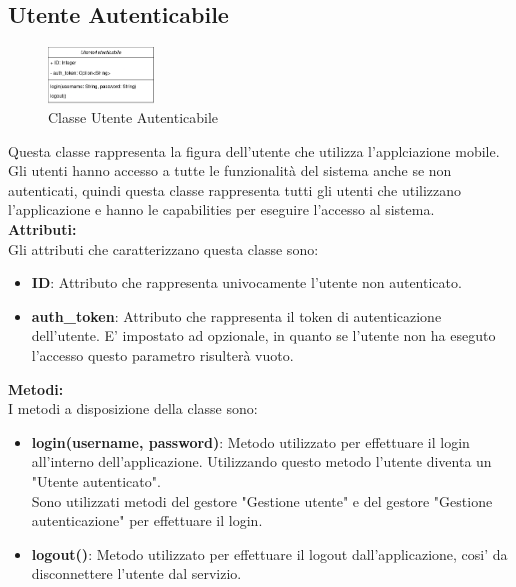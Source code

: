 \documentclass{article}
\begin{document}
\subsection{Utente Autenticabile}

\begin{figure}[htbp]
	\centering
	\includegraphics[width=0.25\textwidth]{Images/UtenteAutenticabile-Class.png}
	\caption{Classe Utente Autenticabile}
	\label{fig:UtenteAutenticabile}
\end{figure}

Questa classe rappresenta la figura dell'utente che utilizza l'applciazione mobile.\\
Gli utenti hanno accesso a tutte le funzionalità del sistema anche se non autenticati, quindi questa classe rappresenta tutti gli utenti che utilizzano l'applicazione e hanno le capabilities per eseguire l'accesso al sistema.\\

\textbf{Attributi:}\\

Gli attributi che caratterizzano questa classe sono:
\begin{itemize}
	\item \textbf{ID}: Attributo che rappresenta univocamente l'utente non autenticato.
	\item \textbf{auth\_token}: Attributo che rappresenta il token di autenticazione dell'utente. E' impostato ad opzionale, in quanto se l'utente non ha eseguto l'accesso questo parametro risulterà vuoto.
\end{itemize}

\textbf{Metodi:}\\

I metodi a disposizione della classe sono:
\begin{itemize}
	\item \textbf{login(username, password)}: Metodo utilizzato per effettuare il login all'interno dell'applicazione. Utilizzando questo metodo l'utente diventa un "Utente autenticato".\\Sono utilizzati metodi del gestore "Gestione utente" e del gestore "Gestione autenticazione" per effettuare il login.
	\item \textbf{logout()}: Metodo utilizzato per effettuare il logout dall'applicazione, cosi' da disconnettere l'utente dal servizio.\\
\end{itemize} 
\end{document}
